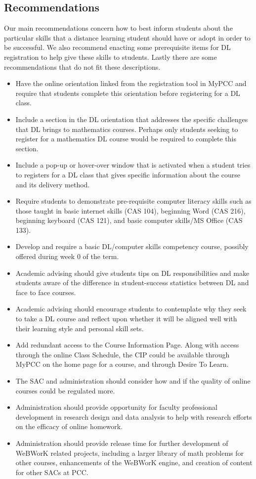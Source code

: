 \subsection{Recommendations}
Our main recommendations concern how to best inform students about the particular skills that a distance learning student should have or adopt in order to be successful. We also recommend enacting some prerequisite items for DL registration to help give these skills to students. Lastly there are some recommendations that do not fit these descriptions.
\begin{itemize}
\item Have the online orientation linked from the registration tool in MyPCC and require that students complete this orientation before registering for a DL class.
\item Include a section in the DL orientation that addresses the specific challenges that DL brings to mathematics courses. Perhaps only students seeking to register for a mathematics DL course would be required to complete this section.
\item Include a pop-up or hover-over window that is activated when a student tries to registers for a DL class that gives specific information about the course and its delivery method.  
\item Require students to demonstrate pre-requisite computer literacy skills such as those taught in basic internet skills (CAS 104), beginning Word (CAS 216), beginning keyboard (CAS 121), and basic computer skills/MS Office (CAS 133).
\item Develop and require a basic DL/computer skills competency course, possibly offered during week 0 of the term.  
\item Academic advising should give students tips on DL responsibilities and make students aware of the difference in student-success statistics between DL and face to face courses.
\item Academic advising should encourage students to contemplate why they seek to take a DL course and reflect upon whether it will be aligned well with their learning style and personal skill sets.
\item Add redundant access to the Course Information Page. Along with access through the online Class Schedule, the CIP could be available through MyPCC on the home page for a course, and through Desire To Learn.
\item The SAC and administration should consider how and if the quality of online courses could be regulated more. 
\item Administration should provide opportunity for faculty professional development in research design and data analysis to help with research efforts on the efficacy of online homework.
\item Administration should provide release time for further development of WeBWorK related projects, including a larger library of math problems for other courses, enhancements of the WeBWorK engine, and creation of content for other SACs at PCC.
\end{itemize}

